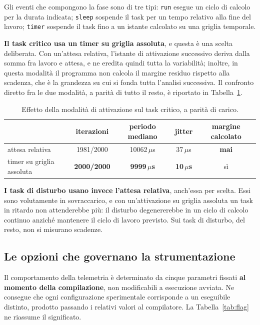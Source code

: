 \documentclass[11pt,a4paper]{article}
\newcommand{\us}{\,$\mu$s}
\begin{document}
Gli eventi che compongono la fase sono di tre tipi: \texttt{run} esegue un ciclo di calcolo per la
durata indicata; \texttt{sleep} sospende il task per un tempo relativo alla fine del lavoro;
\texttt{timer} sospende il task fino a un istante calcolato su una griglia temporale.

\textbf{Il task critico usa un timer su griglia assoluta}, e questa \`e una scelta deliberata. Con
un'attesa relativa, l'istante di attivazione successivo deriva dalla somma fra lavoro e attesa, e
ne eredita quindi tutta la variabilit\`a; inoltre, in questa modalit\`a il programma non calcola il
margine residuo rispetto alla scadenza, che \`e la grandezza su cui si fonda tutta l'analisi
successiva. Il confronto diretto fra le due modalit\`a, a parit\`a di tutto il resto, \`e riportato
in Tabella~\ref{tab:timer}.

\begin{table}[h]\centering\small
\begin{tabular}{lcccc}
\toprule
 & iterazioni & periodo mediano & jitter & margine calcolato \\
\midrule
attesa relativa & 1981/2000 & 10062\us & 37\us & \textbf{mai} \\
timer su griglia assoluta & \textbf{2000/2000} & \textbf{9999\us} & \textbf{10\us} & s\`i \\
\bottomrule
\end{tabular}
\caption{Effetto della modalit\`a di attivazione sul task critico, a parit\`a di carico.}
\label{tab:timer}
\end{table}

\textbf{I task di disturbo usano invece l'attesa relativa}, anch'essa per scelta. Essi sono
volutamente in sovraccarico, e con un'attivazione su griglia assoluta un task in ritardo non
attenderebbe pi\`u: il disturbo degenererebbe in un ciclo di calcolo continuo anzich\'e mantenere
il ciclo di lavoro previsto. Sui task di disturbo, del resto, non si misurano scadenze.

\subsection{Le opzioni che governano la strumentazione}

Il comportamento della telemetria \`e determinato da cinque parametri fissati \textbf{al momento
della compilazione}, non modificabili a esecuzione avviata. Ne consegue che ogni configurazione
sperimentale corrisponde a un eseguibile distinto, prodotto passando i relativi valori al
compilatore. La Tabella~\ref{tab:flag} ne riassume il significato.
\end{document}
